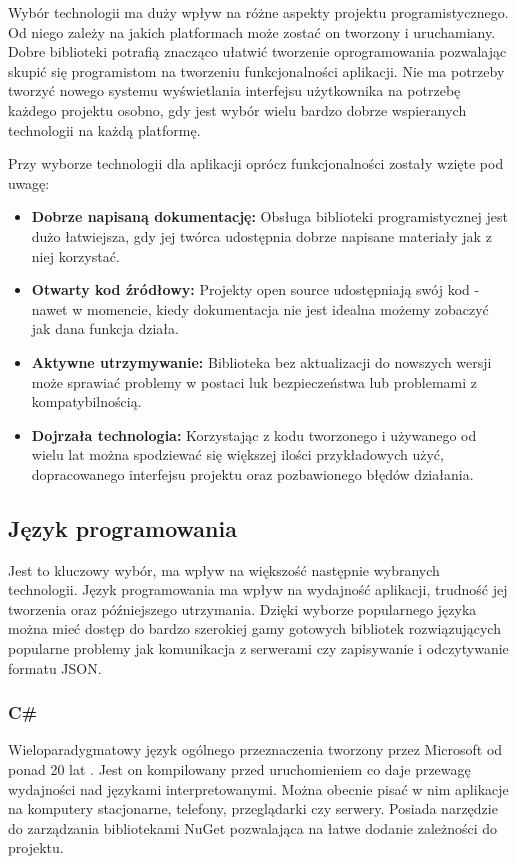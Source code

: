 Wybór technologii ma duży wpływ na różne aspekty projektu programistycznego.
Od niego zależy na jakich platformach może zostać on tworzony i uruchamiany.
Dobre biblioteki potrafią znacząco ułatwić tworzenie oprogramowania pozwalając skupić się programistom na tworzeniu funkcjonalności aplikacji.
Nie ma potrzeby tworzyć nowego systemu wyświetlania interfejsu użytkownika na potrzebę każdego projektu osobno, gdy jest wybór wielu bardzo dobrze wspieranych technologii na każdą platformę.

Przy wyborze technologii dla aplikacji oprócz funkcjonalności zostały wzięte pod uwagę:
\begin{itemize}
    \item \textbf{Dobrze napisaną dokumentację:} Obsługa biblioteki programistycznej jest dużo łatwiejsza, gdy jej twórca udostępnia dobrze napisane materiały jak z niej korzystać.
    \item \textbf{Otwarty kod źródłowy:} Projekty open source udostępniają swój kod - nawet w momencie, kiedy dokumentacja nie jest idealna możemy zobaczyć jak dana funkcja działa.
    \item \textbf{Aktywne utrzymywanie:} Biblioteka bez aktualizacji do nowszych wersji może sprawiać problemy w postaci luk bezpieczeństwa lub problemami z kompatybilnością.
    \item \textbf{Dojrzała technologia:} Korzystając z kodu tworzonego i używanego od wielu lat można spodziewać się większej ilości przykładowych użyć, dopracowanego interfejsu projektu oraz pozbawionego błędów działania.
\end{itemize}

\subsection{Język programowania}

Jest to kluczowy wybór, ma wpływ na większość następnie wybranych technologii.
Język programowania ma wpływ na wydajność aplikacji, trudność jej tworzenia oraz późniejszego utrzymania.
Dzięki wyborze popularnego języka można mieć dostęp do bardzo szerokiej gamy gotowych bibliotek rozwiązujących popularne problemy jak komunikacja z serwerami czy zapisywanie i odczytywanie formatu JSON.

\subsubsection{C\#}

Wieloparadygmatowy język ogólnego przeznaczenia tworzony przez Microsoft od ponad 20 lat \cite{csharp}.
Jest on kompilowany przed uruchomieniem co daje przewagę wydajności nad językami interpretowanymi.
Można obecnie pisać w nim aplikacje na komputery stacjonarne, telefony, przeglądarki czy serwery.
Posiada narzędzie do zarządzania bibliotekami NuGet \cite{nuget} pozwalająca na łatwe dodanie zależności do projektu.

